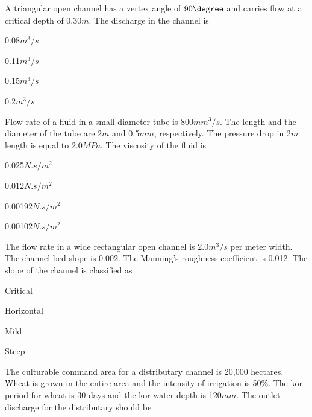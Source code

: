 \iffalse
  \author{EE24BTECH11007}
  \section{ce}
  \chapter{2007}
\fi
\item A triangular open channel has a vertex angle of $90\degree$ and carries flow at a critical depth of 0.30$m$. The discharge in the channel is
\begin{enumerate}
\begin{multicols}{4}
\item 0.08$m^3/s$
\item 0.11$m^3/s$
\item 0.15$m^3/s$
\item 0.2$m^3/s$
\end{multicols}
\end{enumerate}
\item Flow rate of a fluid  in a small diameter tube is 800$mm^3/s$. The length and the diameter of the tube are 2$m$ and 0.5$mm$, respectively. The pressure drop in 2$m$ length is equal to 2.0$MPa$. The viscosity of the fluid is 
\begin{enumerate}
\begin{multicols}{4}
\item 0.025$N.s/m^2$
\item 0.012$N.s/m^2$
\item 0.00192$N.s/m^2$
\item 0.00102$N.s/m^2$
\end{multicols}
\end{enumerate}
\item The flow rate in a wide rectangular open channel is 2.0$m^3/s$ per meter width. The channel bed slope is 0.002. The Manning's roughness coefficient is 0.012. The slope of the channel is classified as
\begin{enumerate}
\begin{multicols}{4}
\item Critical
\item Horizontal
\item Mild
\item Steep
\end{multicols}
\end{enumerate}
\item The culturable command area for a distributary channel is 20,000 hectares. Wheat is grown in the entire area and the intensity of irrigation is 50\%. The kor period for wheat is 30 days and the kor water depth is 120$mm$. The outlet discharge for the distributary should be
